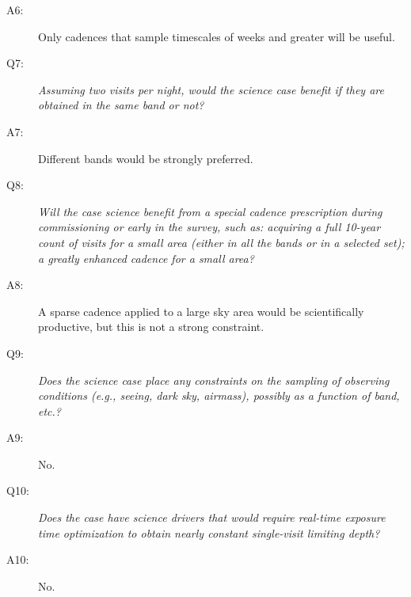 \begin{description}
 \item[A6:] Only cadences that sample timescales of weeks and greater will be useful.

 \item[Q7:] {\it Assuming two visits per night, would the science case
 benefit if they are obtained in the same band or not?}

 \item[A7:] Different bands would be strongly preferred.

 \item[Q8:] {\it Will the case science benefit from a special cadence
 prescription during commissioning or early in the survey, such as:
 acquiring a full 10-year count of visits for a small area (either in all
 the bands or in a  selected set); a greatly enhanced cadence for a small
 area?}

 \item[A8:] A sparse cadence applied to a large sky area would be scientifically productive, but this is not a strong constraint.

 \item[Q9:] {\it Does the science case place any constraints on the
 sampling of observing conditions (e.g., seeing, dark sky, airmass),
 possibly as a function of band, etc.?}

 \item[A9:] No.

 \item[Q10:] {\it Does the case have science drivers that would require
 real-time exposure time optimization to obtain nearly constant
 single-visit limiting depth?}

 \item[A10:] No.

 \end{description}

 \navigationbar
